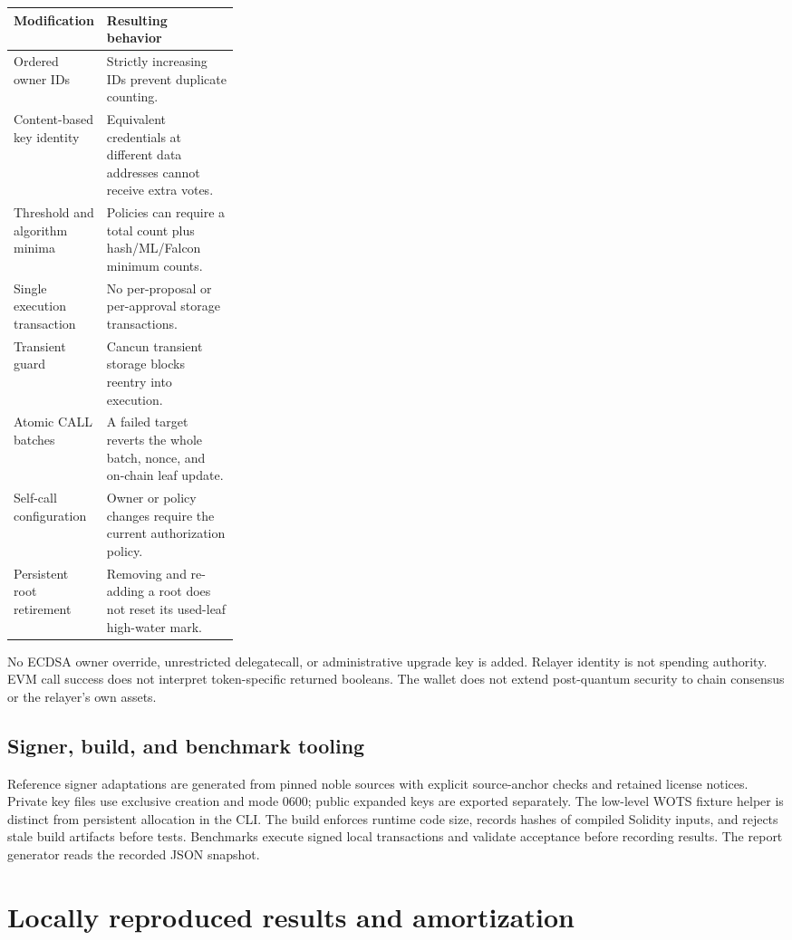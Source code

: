 \documentclass[11pt,a4paper]{article}
\begin{document}
\begin{tabularx}{\linewidth}{P{0.29\linewidth}Y}
\toprule
\textbf{Modification} & \textbf{Resulting behavior}\\
\midrule
Ordered owner IDs & Strictly increasing IDs prevent duplicate counting.\\
Content-based key identity & Equivalent credentials at different data addresses cannot receive extra votes.\\
Threshold and algorithm minima & Policies can require a total count plus hash/ML/Falcon minimum counts.\\
Single execution transaction & No per-proposal or per-approval storage transactions.\\
Transient guard & Cancun transient storage blocks reentry into execution.\\
Atomic CALL batches & A failed target reverts the whole batch, nonce, and on-chain leaf update.\\
Self-call configuration & Owner or policy changes require the current authorization policy.\\
Persistent root retirement & Removing and re-adding a root does not reset its used-leaf high-water mark.\\
\bottomrule
\end{tabularx}

No ECDSA owner override, unrestricted delegatecall, or administrative upgrade
key is added. Relayer identity is not spending authority. EVM call success
does not interpret token-specific returned booleans. The wallet does not
extend post-quantum security to chain consensus or the relayer's own assets.

\subsection{Signer, build, and benchmark tooling}
Reference signer adaptations are generated from pinned noble sources with
explicit source-anchor checks and retained license notices. Private key
files use exclusive creation and mode 0600; public expanded keys are exported
separately. The low-level WOTS fixture helper is distinct from persistent
allocation in the CLI. The build enforces runtime code size, records hashes
of compiled Solidity inputs, and rejects stale build artifacts before tests.
Benchmarks execute signed local transactions and validate acceptance before
recording results. The report generator reads the recorded JSON snapshot.

\newpage
\section{Locally reproduced results and amortization}
\end{document}
